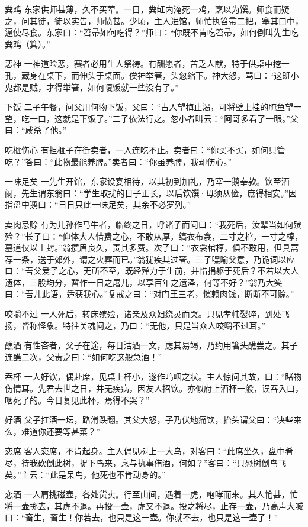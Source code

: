 \documentclass[12pt,UTF8]{ctexbook}
\begin{document}
粪鸡
东家供师甚薄，久不买荤。一日，粪缸内淹死一鸡，烹以为馔。师食而疑之，问其徒，徒以实告，师愤甚。少顷，主人进馆，师忙执笤帚二把，塞其口中，逼使尽食。东家曰：“笤帚如何吃得？”师曰：“你既不肯吃笤帚，如何倒叫先生吃粪鸡（箕）。”

恶神
一神道险恶，赛者必用生人祭祷。有酬愿者，苦乏人献，特于供桌中挖一孔，藏身在桌下，而伸头于桌面。俟神举箸，头忽缩下。神大怒，骂曰：“这班小鬼都是贼，才得举箸，如何嗄饭就一些没有了。”

下饭
二子午餐，问父用何物下饭，父曰：“古人望梅止渴，可将壁上挂的腌鱼望一望，吃一口，这就是下饭了。”二子依法行之。忽小者叫云：“阿哥多看了一眼。”父曰：“咸杀了他。”

吃榧伤心
有担榧子在街卖者，一人连吃不止。卖者曰：“你买不买，如何只管吃？”答曰：“此物最能养脾。”卖者曰：“你虽养脾，我却伤心。”

一味足矣
一先生开馆，东家设宴相待，以其初到加礼，乃宰一鹅奉款。饮至酒阑，先生谓东翁曰：“学生取扰的日子正长，以后饮馔·毋须从俭，庶得相安。”因指盘中鹅曰：“日日只此一味足矣，其余不必罗列。”

卖肉忌赊
有为儿孙作马牛者，临终之日，呼诸子而问曰：“我死后，汝辈当如何殡殓？”长子曰：“仰体大人惜费之心，不敢从厚，缟衣布衾，二寸之棺，一寸之椁，墓道仅以土封。”翁攒眉良久，责其多费。次子曰：“衣衾棺椁，俱不敢用，但具蒿荐一条，送于郊外，谓之火葬而已。”翁犹疾其过奢。三子嘿喻父意，乃诡词以应曰：“吾父爱子之心，无所不至，既经殚力于生前，并惜捐躯于死后？不若以大人遗体，三股均分，暂作一日之屠儿，以享百年之遗泽，何等不好？”翁乃大笑曰：“吾儿此语，适获我心。”复戒之曰：“对门王三老，惯赖肉钱，断断不可赊。”

咬嚼不过
一人死后，转床殡殓，诸亲及众妇绕灵而哭。只见孝帏裂碎，到处飞扬，皆称怪象。特往关魂问之，乃曰：“无他，只是当众人咬嚼不过耳。”

醮酒
有性吝者，父子在途，每日沽酒一文，虑其易竭，乃约用箸头醮尝之。其子连醮二次，父责之曰：“如何吃这般急酒！”

吞杯
一人好饮，偶赴席，见桌上杯小，遂作呜咽之状。主人惊问其故，曰：“睹物伤情耳。先君去世之日，并无疾病，因友人招饮。亦似府上酒杯一般，误吞入口，咽死了的。今日复见此杯，焉得不哭？”

好酒
父子扛酒一坛，路滑跌翻。其父大怒，子乃伏地痛饮，抬头谓父曰：“决些来么，难道你还要等甚菜？”

恋席
客人恋席，不肯起身。主人偶见树上一大鸟，对客曰：“此席坐久，盘中肴尽，待我砍倒此树，捉下鸟来，烹与执事侑酒，何如？”客曰：“只恐树倒鸟飞矣。”主云：“此是呆鸟，他死也不肯动身的。”

恋酒
一人肩挑磁壶，各处货卖。行至山间，遇着一虎，咆哮而来。其人怆甚，忙将一壶掷去，其虎不退。再投一壶，虎又不退。投之将尽，止存一壶，乃高声大喊曰：“畜生，畜生！你若去，也只是这一壶。你就不去，也只是这一壶了！”
\end{document}

